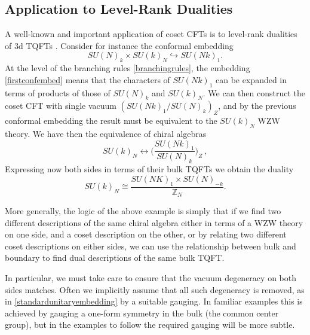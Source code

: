 \documentclass[11pt]{article}
\numberwithin{equation}{section}
\begin{document}
\subsection*{Application to Level-Rank Dualities}

A well-known and important application of coset CFTs is to level-rank dualities of 3d TQFTs \cite{Nakanishi:1990hj,Naculich:1990pa, Mlawer:1990uv, Witten:1993xi, Douglas:1994ex, Naculich:2007nc, Hsin:2016blu,Aharony:2016jvv,Cordova:2017vab,Cordova:2018qvg}.  Consider for instance the conformal embedding
\begin{equation}\label{firstconfembed}
    SU(N)_{k} \times SU(k)_{N} \hookrightarrow SU(Nk)_{1}.
\end{equation}
 At the level of the branching rules \eqref{branchingrules}, the embedding \eqref{firstconfembed} means that the characters of $SU(Nk)_{1}$ can be expanded in terms of products of those of $SU(N)_{k}$ and $SU(k)_{N}$. We can then construct the coset CFT with single vacuum $(SU(Nk)_{1}/SU(N)_{k})_{Z}$, and by the previous conformal embedding the result must be equivalent to the $SU(k)_{N}$ WZW theory. We have then the equivalence of chiral algebras
\begin{equation}
    SU(k)_{N} \longleftrightarrow \bigg( \frac{SU(Nk)_{1}}{SU(N)_{k}} \bigg)_{Z} \, ,
\end{equation}
Expressing now both sides in terms of their bulk TQFTs we obtain the duality
\begin{equation} \label{standardunitaryembedding}
    SU(k)_{N} \cong \frac{SU(NK)_{1} \times SU(N)_{-k}}{\mathbb{Z}_{N}}.
\end{equation}

More generally, the logic of the above example is simply that if we find two different descriptions of the same chiral algebra either in terms of a WZW theory on one side, and a coset description on the other, or by relating two different coset descriptions on either sides, we can use the relationship between bulk and boundary to find dual descriptions of the same bulk TQFT. 

In particular, we must take care to ensure that the vacuum degeneracy on both sides matches.  Often we implicitly assume that all such degeneracy is removed, as in \eqref{standardunitaryembedding} by a suitable gauging.  In familiar examples this is achieved by gauging a one-form symmetry in the bulk (the common center group), but in the examples to follow the required gauging will be more subtle.  
\end{document}
